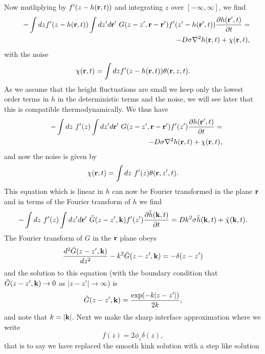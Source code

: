 Now mutliplying by $f'(z-h({\bf r},t))$ and integrating $z$ over $[-\infty,\infty]$, we find
\begin{eqnarray}
&&-\int dz f'(z-h({\bf r},t))\int dz'd{\bf r}'\  G(z-z',{\bf r}-{\bf r}') f'(z'-h({\bf r}',t))\frac{\partial h({\bf r}',t)}{\partial t} = \\
&&-D\sigma \nabla^2 h({\bf r},t) + \chi({\bf r},t),
\end{eqnarray}
with the noise
\begin{equation}
\chi({\bf r},t)= \int dz f'(z-h({\bf r},t)) \theta({\bf r},z,t).
\end{equation}
As we assume that the height fluctuations are small we keep only the lowest order terms in $h$ in the deterministic terms and the noise, we will see later that this is compatible thermodynamically. We thus have
\begin{eqnarray}
&&-\int dz \ f'(z)\int dz'd{\bf r}'\  G(z-z',{\bf r}-{\bf r}') f'(z')\frac{\partial h({\bf r}',t)}{\partial t} = \\
&&-D\sigma \nabla^2 h({\bf r},t) + \chi({\bf r},t),
\end{eqnarray}
and now  the noise is given by
\begin{equation}
\chi({\bf r},t)= \int dz\  f'(z) \theta({\bf r},z',t).
\end{equation}
This equation which is linear in $h$ can now be Fourier transformed in the plane ${\bf r}$ and in terms of the Fourier transform of $h$ we find
\begin{equation}
-\int dz \ f'(z)\int dz'd{\bf r}'\ \tilde G(z-z',{\bf k}) f'(z')\frac{\partial\tilde h({\bf k},t)}{\partial t} = 
Dk^2\sigma \tilde h({\bf k},t) + \tilde \chi({\bf k},t).\label{bstep}
\end{equation}
The Fourier transform of $G$ in the ${\bf r}$ plane obeys
\begin{equation}
\frac{d^2 \tilde G(z-z',{\bf k} )}{dz^2}-k^2 \tilde G(z-z',{\bf k} )=-\delta(z-z')
\end{equation}
and the solution to this equation (with the boundary condition that $\tilde G(z-z',{\bf k} )\to 0$ as $|z-z'|\to\infty$)  is
\begin{equation}
\tilde G(z-z',{\bf k}) = \frac{\exp(-k|z-z'|)}{2k},
\end{equation}
and note that $k=|{\bf k}|$. 
Next we make the sharp interface approximation where we write
\begin{equation}
f(z) = 2\phi_c \delta(z),\label{sharp}
\end{equation}
that is to say we have replaced the smooth kink solution with a step like solution

